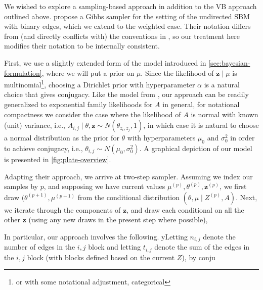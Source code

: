 \documentclass[11pt]{article}   %
\newcommand{\V}[1]{\ensuremath{\boldsymbol{#1}}}
\begin{document}
We wished to explore a sampling-based approach in addition to the VB approach outlined above.
\Textcite{snijders_estimation_1997} propose a Gibbs sampler for the setting of the undirected SBM with binary edges, which we extend to the weighted case.
Their notation differs from (and directly conflicts with) the conventions in \parencite{aicher_adapting_2013,aicher_learning_2015}, so our treatment here modifies their notation to be internally consistent.

First, we use a slightly extended form of the model introduced in \autoref{sec:bayesian-formulation}, where we will put a prior on $\mu$.
Since the likelihood of $\V{z} \mid \mu$ is multinomial\footnote{or with some notational adjustment, categorical}, choosing a Dirichlet prior with hyperparameter $\alpha$ is a natural choice that gives conjugacy.
Like the model from \textcite{aicher_adapting_2013,aicher_learning_2015}, our approach can be readily generalized to exponential family likelihoods for $A$ in general, for notational compactness we consider the case where the likelihood of $A$ is normal with known (unit) variance, i.e., $A_{i,j} \mid \theta, \V{z} \sim N(\theta_{z_i,z_j},1)$, in which case it is natural to choose a normal distribution as the prior for $\theta$ with hyperparameters $\mu_0$ and $\sigma^2_0$ in order to achieve conjugacy, i.e., $\theta_{i,j} \sim N(\mu_0, \sigma_0^2)$.
A graphical depiction of our model is presented in \autoref{fig:plate-overview}.


Adapting their approach, we arrive at two-step sampler.
Assuming we index our samples by $p$, and supposing we have current values  $\mu^{(p)}, \theta^{(p)}, \V{z}^{(p)}$, we first draw $(\theta^{(p+1)}, \mu^{(p+1)}$ from the conditional distribution $(\theta, \mu \mid Z^{(p)}, A)$.
Next, we iterate through the components of $\V{z}$, and draw each conditional on all the other $\V{z}$ (using any new draws in the present step where possible),

In particular, our approach involves the following.
yLetting $n_{i,j}$ denote the number of edges in the $i,j$ block and letting $t_{i,j}$ denote the sum of the edges in the $i,j$ block (with blocks defined based on the current $Z$), by conju
\end{document}
